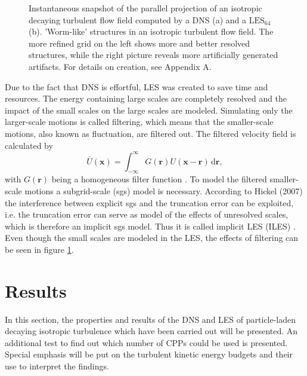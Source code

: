 \documentclass[11pt,a4paper,openany,oneside,parskip=half*]{article}
\renewcommand*\vec[1]{\boldsymbol{#1}}
\begin{document}
\begin{figure}[h]
\begin{minipage}[t]{0.5\textwidth}
        \label{64_velocity}
    \end{minipage}
    \captionsetup{width=0.97\linewidth}
\caption{Instantaneous snapshot of the parallel projection of an isotropic decaying turbulent flow field computed by a DNS (a) and a $\mathrm{LES_{64}}$ (b). 'Worm-like' structures in an isotropic turbulent flow field. The more refined grid on the left shows more and better resolved structures, while the right picture reveals more artificially generated artifacts. For details on creation, see Appendix A.}
\label{comparisonLESDNS}
\end{figure}
Due to the fact that DNS is effortful, LES was created to save time and resources. The energy containing large scales are completely resolved and the impact of the small scales on the large scales are modeled.
\newline
Simulating only the larger-scale motions is called filtering, which means that the smaller-scale motions, also known as fluctuation, are filtered out. The filtered velocity field is calculated by 
\begin{equation}
\bar U(\vec{x}) = \int_{-\infty}^{\infty} G(\vec{r})U(\vec{x} - \vec{r})  \, \mathrm{d}\vec{r},
\end{equation}
with $G(\vec{r}) $ being a homogeneous filter function \cite{turbulentFlows}. To model the filtered smaller-scale motions a subgrid-scale (sgs) model is necessary. According to Hickel (2007) the interference between explicit sgs and the truncation error can be exploited, i.e. the truncation error can serve as model of the effects of unresolved scales, which is therefore an implicit sgs model. Thus it is called implicit LES (ILES) \cite{implicitLES}.
\newline
Even though the small scales are modeled in the LES, the effects of filtering can be seen in figure \ref{comparisonLESDNS}.
\newline
\pagebreak
\section{Results}
In this section, the properties and results of the DNS and LES of particle-laden decaying isotropic turbulence which have been carried out will be presented. An additional test to find out which  number of CPPs could be used is presented. Special emphasis will be put on the turbulent kinetic energy budgets and their use to interpret the findings.
\newline
\end{document}
